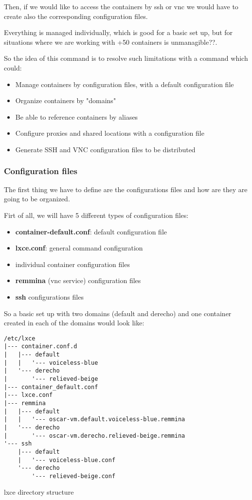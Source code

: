 Then, if we would like to access the containers by ssh or vnc we would have to create also the corresponding configuration files.

Everything is managed individually, which is good for a basic set up, but for situations where we are working with +50 containers is unmanagible??. 

So the idea of this command is to resolve such limitations with a command which could:
\begin{itemize}
	\item{Manage containers by configuration files, with a default configuration file}
	\item{Organize containers by "domains"}
	\item{Be able to reference containers by aliases}
	\item{Configure proxies and shared locations with a configuration file}
	\item{Generate SSH and VNC configuration files to be distributed}
\end{itemize}

\subsubsection{Configuration files}
The first thing we have to define are the configurations files and how are they are going to be organized.

Firt of all, we will have 5 different types of configuration files:
\begin{itemize}
	\item{\textbf{container-default.conf}: default configuration file}
	\item{\textbf{lxce.conf}: general command configuration}
	\item{individual container configuration files}
	\item{\textbf{remmina} (vnc service) configuration files}
	\item{\textbf{ssh} configurations files}
\end{itemize}

So a basic set up with two domains (default and derecho) and one container created in each of the domains would look like:

\begin{listing}[H]
\begin{verbatim}
/etc/lxce 
|--- container.conf.d 			
|   |--- default 			
|   |   '--- voiceless-blue
|   '--- derecho 			
|       '--- relieved-beige
|--- container_default.conf 		
|--- lxce.conf 			
|--- remmina 		
|   |--- default 
|   |   '--- oscar-vm.default.voiceless-blue.remmina
|   '--- derecho 
|       '--- oscar-vm.derecho.relieved-beige.remmina
'--- ssh 	
    |--- default 
    |   '--- voiceless-blue.conf
    '--- derecho
        '--- relieved-beige.conf
\end{verbatim}
\caption{lxce directory structure}
\label{listings: lxce directory structure /etc/lxce}
\end{listing}

